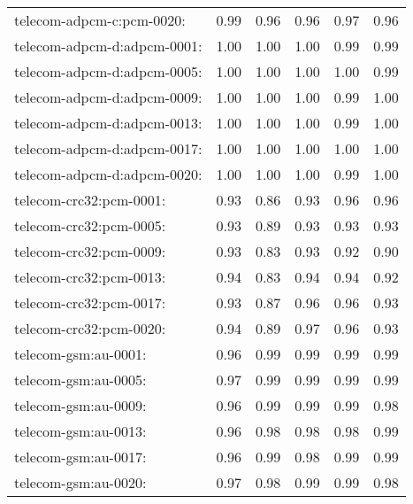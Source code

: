 \begin{longtable}{lrrrrr}
telecom-adpcm-c:pcm-0020: & 0.99 & 0.96 & 0.96 & 0.97 & 0.96 \\
telecom-adpcm-d:adpcm-0001: & 1.00 & 1.00 & 1.00 & 0.99 & 0.99 \\
telecom-adpcm-d:adpcm-0005: & 1.00 & 1.00 & 1.00 & 1.00 & 0.99 \\
telecom-adpcm-d:adpcm-0009: & 1.00 & 1.00 & 1.00 & 0.99 & 1.00 \\
telecom-adpcm-d:adpcm-0013: & 1.00 & 1.00 & 1.00 & 0.99 & 1.00 \\
telecom-adpcm-d:adpcm-0017: & 1.00 & 1.00 & 1.00 & 1.00 & 1.00 \\
telecom-adpcm-d:adpcm-0020: & 1.00 & 1.00 & 1.00 & 0.99 & 1.00 \\
telecom-crc32:pcm-0001: & 0.93 & 0.86 & 0.93 & 0.96 & 0.96 \\
telecom-crc32:pcm-0005: & 0.93 & 0.89 & 0.93 & 0.93 & 0.93 \\
telecom-crc32:pcm-0009: & 0.93 & 0.83 & 0.93 & 0.92 & 0.90 \\
telecom-crc32:pcm-0013: & 0.94 & 0.83 & 0.94 & 0.94 & 0.92 \\
telecom-crc32:pcm-0017: & 0.93 & 0.87 & 0.96 & 0.96 & 0.93 \\
telecom-crc32:pcm-0020: & 0.94 & 0.89 & 0.97 & 0.96 & 0.93 \\
telecom-gsm:au-0001: & 0.96 & 0.99 & 0.99 & 0.99 & 0.99 \\
telecom-gsm:au-0005: & 0.97 & 0.99 & 0.99 & 0.99 & 0.99 \\
telecom-gsm:au-0009: & 0.96 & 0.99 & 0.99 & 0.99 & 0.98 \\
telecom-gsm:au-0013: & 0.96 & 0.98 & 0.98 & 0.98 & 0.99 \\
telecom-gsm:au-0017: & 0.96 & 0.99 & 0.98 & 0.99 & 0.99 \\
telecom-gsm:au-0020: & 0.97 & 0.98 & 0.99 & 0.99 & 0.98 \\
\end{longtable}
